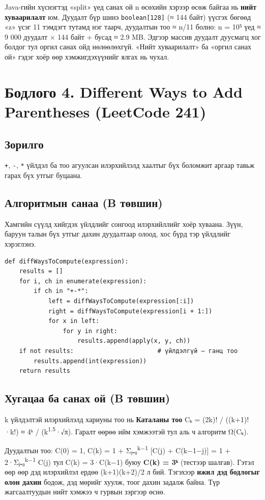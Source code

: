 \documentclass[11pt,a4paper]{article}
\begin{document}
Java-гийн хүснэгтэд «split» үед санах ой n өсөхийн хэрээр өсөж байгаа нь \textbf{нийт хуваарилалт} юм. Дуудалт бүр шинэ \texttt{boolean[128]} (≈ 144 байт) үүсгэх бөгөөд «z» үсэг 11 тэмдэгт тутамд нэг таарч, дуудалтын тоо ≈ n/11 болно: n = 10⁵ үед ≈ 9 000 дуудалт × 144 байт + бусад ≈ 2.9 MB. Эдгээр массив дуудалт дуусмагц хог болдог тул оргил санах ойд нөлөөлөхгүй. «Нийт хуваарилалт» ба «оргил санах ой» гэдэг хоёр өөр хэмжигдэхүүнийг ялгах нь чухал.

\section{Бодлого 4. Different Ways to Add Parentheses (LeetCode 241)}

\subsection{Зорилго}
\texttt{+}, \texttt{-}, \texttt{*} үйлдэл ба тоо агуулсан илэрхийлэлд хаалтыг бүх боломжит аргаар тавьж гарах бүх утгыг буцаана.

\subsection{Алгоритмын санаа (B төвшин)}
Хамгийн сүүлд хийгдэх үйлдлийг сонгоод илэрхийллийг хоёр хуваана. Зүүн, баруун талын бүх утгыг дахин дуудалтаар олоод, хос бүрд тэр үйлдлийг хэрэглэнэ.

\begin{Verbatim}
def diffWaysToCompute(expression):
    results = []
    for i, ch in enumerate(expression):
        if ch in "+-*":
            left = diffWaysToCompute(expression[:i])
            right = diffWaysToCompute(expression[i + 1:])
            for x in left:
                for y in right:
                    results.append(apply(x, y, ch))
    if not results:                       # үйлдэлгүй — ганц тоо
        results.append(int(expression))
    return results
\end{Verbatim}

\subsection{Хугацаа ба санах ой (B төвшин)}
k үйлдэлтэй илэрхийлэлд хариуны тоо нь \textbf{Каталаны тоо} Cₖ = (2k)! / ((k+1)!·k!) ≈ 4ᵏ / (k\textsuperscript{1.5}·√π). Гаралт өөрөө ийм хэмжээтэй тул аль ч алгоритм Ω(Cₖ).

Дуудалтын тоо: C(0) = 1, C(k) = 1 + Σⱼ₌₀\textsuperscript{k−1} [C(j) + C(k−1−j)] = 1 + 2·Σⱼ₌₀\textsuperscript{k−1} C(j) тул C(k) = 3·C(k−1) буюу \textbf{C(k) = 3ᵏ} (тестээр шалгав). Гэтэл өөр өөр дэд илэрхийлэл ердөө (k+1)(k+2)/2 л бий. Тэгэхээр \textbf{ижил дэд бодлогыг олон дахин} бодож, дэд мөрийг хуулж, тоог дахин задалж байна. Түр жагсаалтуудын нийт хэмжээ ч гурвын зэргээр өснө.
\end{document}
